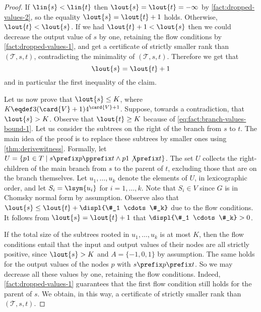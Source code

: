 \FactBranchValuesBoundOne*
\begin{proof}
If $\lin{s} < \lin{t}$ then $\lout{s} = \lout{t} = -\infty$
  by \cref{fact:dropped-values-2},
  so the equality $\lout{s} = \lout{t} + 1$ holds.
  Otherwise, $\lout{t} < \lout{s}$.
  If we had $\lout{t} + 1 < \lout{s}$ then we could
  decrease the output value of $s$ by one,
  retaining the flow conditions by \cref{fact:dropped-values-1},
  and get a certificate
  of strictly smaller rank than $(\mathcal{T}, s, t)$,
  contradicting the minimality of $(\mathcal{T}, s, t)$.
  Therefore we get that
  \begin{equation}
  \label{eq:fact:branch-values-bound-1}
  \lout{s} = \lout{t} + 1
  \end{equation}
  and in particular the first inequality of the claim.

  Let us now prove that $\lout{s} \leq K$,
  where $K \eqdef 3 (\card{V} + 1) 4^{\card{V}+1}$.
  Suppose, towards a contradiction, that $\lout{s} > K$.
  Observe that $\lout{t} \geq K$ because of
  \cref{eq:fact:branch-values-bound-1}.
  Let us consider the subtrees on the right of the branch from $s$ to $t$.
  The main idea of the proof is to replace these subtrees by smaller ones
  using \cref{thm:derivewitness}.
  Formally,
  let $U = \{p1 \in T \mid s \prefix p \pprefix t \wedge p1 \not\prefix t\}$.
  The set $U$ collects the right-children of the main branch from $s$ to the parent of $t$,
  excluding those that are on the branch themselves.
  Let $u_1, \ldots, u_k$ denote the elements of $U$,
  in lexicographic order,
  and let $S_i = \lsym{u_i}$ for $i = 1, \ldots, k$.
  Note that $S_i \in V$ since $G$ is in Chomsky normal form by assumption.
  Observe also that $\lout{s} \leq \lout{t} + \displ{\#_1 \cdots \#_k}$
  due to the flow conditions.
  It follows from $\lout{s} = \lout{t} + 1$ that $\displ{\#_1 \cdots \#_k} > 0$.

  If the total size of the subtrees rooted in $u_1, \ldots, u_k$ is
  at most $K$,
  then the flow conditions entail that
  the input and output values of their nodes are all strictly positive,
  since $\lout{s} > K$ and $A = \{-1,0,1\}$ by assumption.
  The same holds for the output values of the nodes $p$ with
  $s \prefix p \prefix t$.
  So we may decrease all these values by one,
  retaining the flow conditions.
  Indeed,
  \cref{fact:dropped-values-1} guarantees that the first flow condition
  still holds for the parent of $s$.
  We obtain, in this way,
  a certificate of strictly smaller rank than $(\mathcal{T}, s, t)$.


\end{proof}
